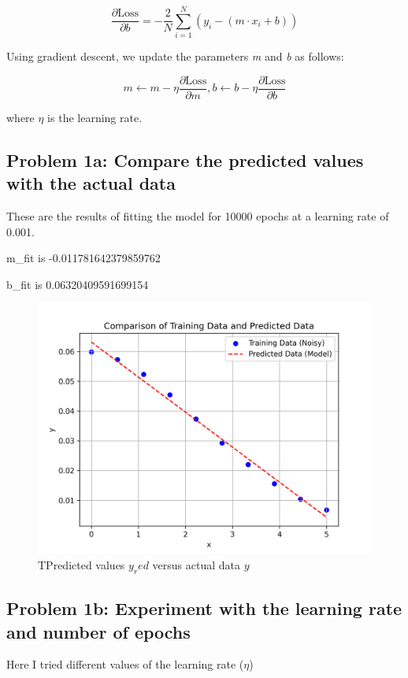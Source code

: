 \documentclass[letterpaper, 10 pt, conference]{ieeeconf}  %
\begin{document}
\begin{equation}
   \frac{\partial \text{Loss}}{\partial b}
   =
   -\frac{2}{N}\sum^{N}_{i=1} (y_i - (m \cdot x_i + b) )
\end{equation}

Using gradient descent, we update the parameters \textit{m} and \textit{b} as follows:

\begin{equation}
   m \leftarrow m - \eta \frac{\partial \text{Loss}}{\partial m}, b \leftarrow b - \eta\frac{\partial \text{Loss}}{\partial b}
\end{equation}

where $\eta$ is the learning rate.

\subsection{Problem 1a: Compare the predicted values with the actual data}
These are the results of fitting the model for 10000 epochs at a learning rate of 0.001.

m_fit is -0.011781642379859762

b_fit is 0.06320409591699154

\begin{figure}[h!]
   \centering
   \includegraphics[width=0.8\linewidth]{../Figures/linear_regression_e_10000_n_0.001.png}
   \caption{TPredicted values $y_red$ versus actual data $y$}
   \label{fig:Lin_a}
\end{figure}


\subsection{Problem 1b: Experiment with the learning rate and number of epochs}
Here I tried different values of the learning rate ($\eta$)
\end{document}

